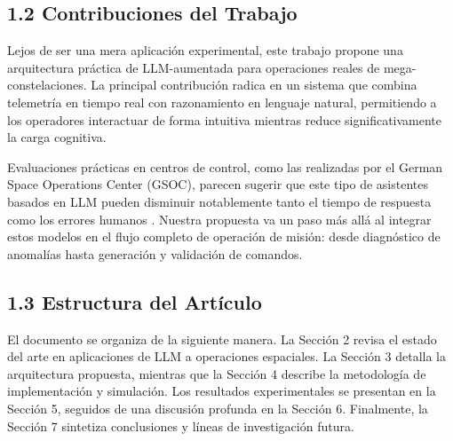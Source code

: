 \subsection{1.2 Contribuciones del Trabajo}

Lejos de ser una mera aplicación experimental, este trabajo propone una arquitectura práctica de LLM-aumentada para operaciones reales de mega-constelaciones. La principal contribución radica en un sistema que combina telemetría en tiempo real con razonamiento en lenguaje natural, permitiendo a los operadores interactuar de forma intuitiva mientras reduce significativamente la carga cognitiva.

Evaluaciones prácticas en centros de control, como las realizadas por el German Space Operations Center (GSOC), parecen sugerir que este tipo de asistentes basados en LLM pueden disminuir notablemente tanto el tiempo de respuesta como los errores humanos \cite{schefels2024evaluating}. Nuestra propuesta va un paso más allá al integrar estos modelos en el flujo completo de operación de misión: desde diagnóstico de anomalías hasta generación y validación de comandos.

\subsection{1.3 Estructura del Artículo}

El documento se organiza de la siguiente manera. La Sección 2 revisa el estado del arte en aplicaciones de LLM a operaciones espaciales. La Sección 3 detalla la arquitectura propuesta, mientras que la Sección 4 describe la metodología de implementación y simulación. Los resultados experimentales se presentan en la Sección 5, seguidos de una discusión profunda en la Sección 6. Finalmente, la Sección 7 sintetiza conclusiones y líneas de investigación futura.